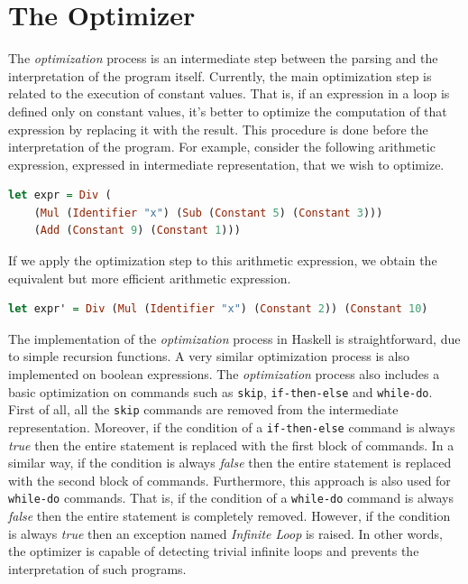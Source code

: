\documentclass[12pt,a4paper]{article}
\begin{document}
\section*{The Optimizer}
The \textit{optimization} process is an intermediate step between the parsing and the interpretation of the program itself.
Currently, the main optimization step is related to the execution of constant values.
That is, if an expression in a loop is defined only on constant values, it's better to optimize the computation of that expression by replacing it with the result.
This procedure is done before the interpretation of the program.
For example, consider the following arithmetic expression, expressed in intermediate representation, that we wish to optimize.
\begin{lstlisting}[language=Haskell, style=custom-style]
let expr = Div (
    (Mul (Identifier "x") (Sub (Constant 5) (Constant 3)))
    (Add (Constant 9) (Constant 1)))
\end{lstlisting}
If we apply the optimization step to this arithmetic expression, we obtain the equivalent but more efficient arithmetic expression.
\begin{lstlisting}[language=Haskell, style=custom-style]
let expr' = Div (Mul (Identifier "x") (Constant 2)) (Constant 10)
\end{lstlisting}
The implementation of the \textit{optimization} process in Haskell is straightforward, due to simple recursion functions.
A very similar optimization process is also implemented on boolean expressions.
The \textit{optimization} process also includes a basic optimization on commands such as \texttt{skip}, \texttt{if-then-else} and \texttt{while-do}.
First of all, all the \texttt{skip} commands are removed from the intermediate representation.
Moreover, if the condition of a \texttt{if-then-else} command is always \textit{true} then the entire statement is replaced with the first block of commands.
In a similar way, if the condition is always \textit{false} then the entire statement is replaced with the second block of commands.
Furthermore, this approach is also used for \texttt{while-do} commands.
That is, if the condition of a \texttt{while-do} command is always \textit{false} then the entire statement is completely removed.
However, if the condition is always \textit{true} then an exception named \textit{Infinite Loop} is raised.
In other words, the optimizer is capable of detecting trivial infinite loops and prevents the interpretation of such programs.
\end{document}
